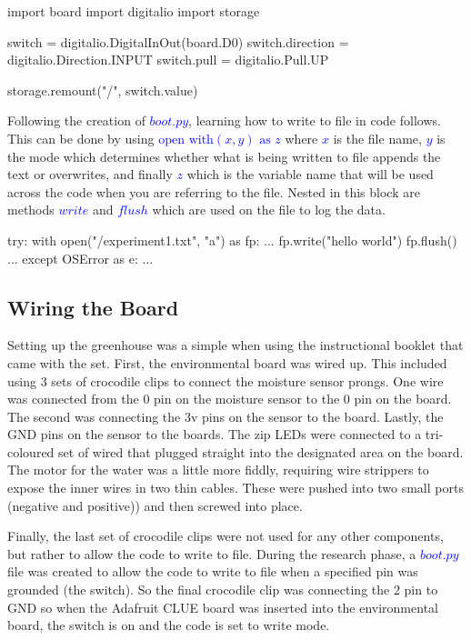 \begin{python}[caption={boot.py}, captionpos=b]
    import board
    import digitalio
    import storage
    
    switch = digitalio.DigitalInOut(board.D0)
    switch.direction = digitalio.Direction.INPUT
    switch.pull = digitalio.Pull.UP

    storage.remount("/", switch.value)
\end{python}

Following the creation of \textcolor{blue}{$boot.py$}, learning how to write to file in code follows. This can be done by using \textcolor{blue}{$\textrm{open with}(x, y) \textrm{ as } z$} where \textcolor{blue}{$x$} is the file name, \textcolor{blue}{$y$} is the mode which determines whether what is being written to file appends the text or overwrites, and finally \textcolor{blue}{$z$} which is the variable name that will be used across the code when you are referring to the file. Nested in this block are methods \textcolor{blue}{$write$} and \textcolor{blue}{$flush$}  which are used on the file to log the data.

\begin{python}[caption={writing to file}, captionpos=b]
    try:
        with open("/experiment1.txt", "a") as fp:
            ... 
            fp.write("hello world")
            fp.flush()
            ...
    except OSError as e:
    ...
\end{python}

\subsection{Wiring the Board}

Setting up the greenhouse was a simple when using the instructional booklet that came with the set. First, the environmental board was wired up. This included using 3 sets of crocodile clips to connect the moisture sensor prongs. One wire was connected from the 0 pin on the moisture sensor to the 0 pin on the board. The second was connecting the 3v pins on the sensor to the board. Lastly, the GND pins on the sensor to the boards. The zip LEDs were connected to a tri-coloured set of wired that plugged straight into the designated area on the board. The motor for the water was a little more fiddly, requiring wire strippers to expose the inner wires in two thin cables. These were pushed into two small ports (negative and positive)) and then screwed into place.

Finally, the last set of crocodile clips were not used for any other components, but rather to allow the code to write to file. During the research phase, a \textcolor{blue}{$boot.py$} file was created to allow the code to write to file when a specified pin was grounded (the switch). So the final crocodile clip was connecting the 2 pin to GND so when the Adafruit CLUE board was inserted into the environmental board, the switch is on and the code is set to write mode.

